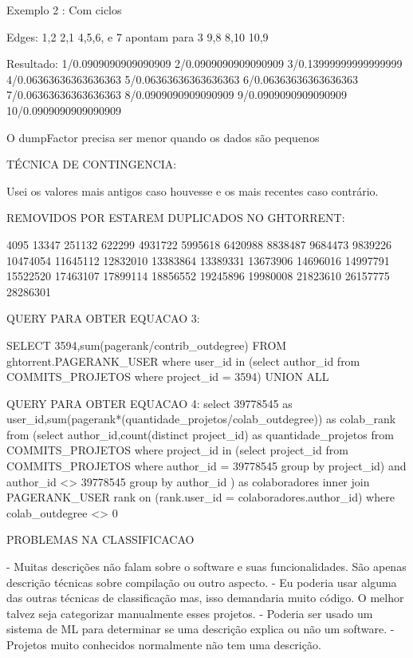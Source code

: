 Exemplo 2 :  Com ciclos

Edges:  
1,2 
2,1 
4,5,6, e 7 apontam para 3 
9,8
8,10
10,9

Resultado:
1/0.0909090909090909
2/0.0909090909090909
3/0.13999999999999999
4/0.06363636363636363
5/0.06363636363636363
6/0.06363636363636363
7/0.06363636363636363
8/0.0909090909090909
9/0.0909090909090909
10/0.0909090909090909

O dumpFactor precisa ser menor quando os dados são pequenos



TÉCNICA DE CONTINGENCIA:

Usei os valores mais antigos caso houvesse e os mais recentes caso contrário.



REMOVIDOS POR ESTAREM DUPLICADOS NO GHTORRENT:

4095
13347
251132
622299
4931722
5995618
6420988
8838487
9684473
9839226
10474054
11645112
12832010
13383864
13389331
13673906
14696016
14997791
15522520
17463107
17899114
18856552
19245896
19980008
21823610
26157775
28286301


QUERY PARA OBTER EQUACAO 3:

SELECT 3594,sum(pagerank/contrib_outdegree) FROM ghtorrent.PAGERANK_USER where user_id in (select author_id from COMMITS_PROJETOS  where project_id = 3594) UNION ALL


QUERY PARA OBTER EQUACAO 4:
select 39778545 as user_id,sum(pagerank*(quantidade_projetos/colab_outdegree)) as colab_rank from (select author_id,count(distinct project_id) as quantidade_projetos from COMMITS_PROJETOS where project_id in (select project_id from COMMITS_PROJETOS where author_id = 39778545 group by project_id)   and author_id <> 39778545  group by author_id ) as colaboradores inner join PAGERANK_USER rank on (rank.user_id = colaboradores.author_id) where colab_outdegree <> 0 


PROBLEMAS NA CLASSIFICACAO

 - Muitas descrições não falam sobre o software e suas funcionalidades. São apenas descrição técnicas sobre compilação ou outro aspecto.
  - Eu poderia usar alguma das outras técnicas de classificação mas, isso demandaria muito código. O melhor talvez seja categorizar manualmente esses projetos.
  - Poderia ser usado um sistema de ML para determinar se uma descrição explica ou não um software.
  - Projetos muito conhecidos normalmente não tem uma descrição.






